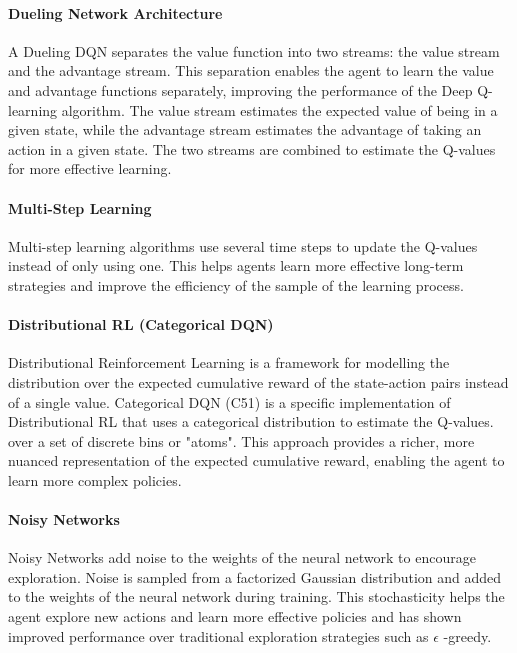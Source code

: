 \paragraph*{Dueling Network Architecture}
A Dueling DQN \cite{wangDuelingNetworkArchitectures2016} separates the value function into two streams: the value stream and the advantage stream. This separation enables the agent to learn the value and advantage functions separately, improving the performance of the Deep Q-learning algorithm. The value stream estimates the expected value of being in a given state, while the advantage stream estimates the advantage of taking an action in a given state. The two streams are combined to estimate the Q-values for more effective learning.
\paragraph*{Multi-Step Learning}
Multi-step learning \cite{asisMultistepReinforcementLearning2018} algorithms use several time steps to update the Q-values instead of only using one. This helps agents learn more effective long-term strategies and improve the efficiency of the sample of the learning process.
\paragraph*{Distributional RL (Categorical DQN)}
Distributional Reinforcement Learning \cite{bellemareDistributionalPerspectiveReinforcement2017} is a framework for modelling the distribution over the expected cumulative reward of the state-action pairs instead of a single value. Categorical DQN (C51) is a specific implementation of Distributional RL that uses a categorical distribution to estimate the Q-values. over a set of discrete bins or "atoms". This approach provides a richer, more nuanced representation of the expected cumulative reward, enabling the agent to learn more complex policies.
\paragraph*{Noisy Networks}
Noisy Networks \cite{fortunatoNoisyNetworksExploration2019} add noise to the weights of the neural network to encourage exploration. Noise is sampled from a factorized Gaussian distribution and added to the weights of the neural network during training. This stochasticity helps the agent explore new actions and learn more effective policies and has shown improved performance over traditional exploration strategies such as $\epsilon$ -greedy.
